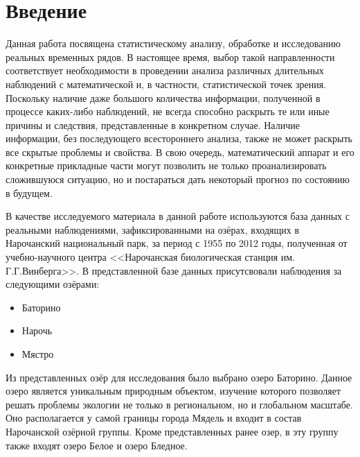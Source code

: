 \newpage

\chapter*{Введение}

Данная работа посвящена статистическому анализу, обработке и исследованию реальных временных рядов. В настоящее время, выбор такой направленности соответствует необходимости в проведении анализа различных длительных наблюдений с математической и, в частности, статистической точек зрения. Поскольку наличие даже большого количества информации, полученной в процессе каких-либо наблюдений, не всегда способно раскрыть те или иные причины и следствия, представленные в конкретном случае. Наличие информации, без последующего всестороннего анализа, также не может раскрыть все скрытые проблемы и свойства. В свою очередь, математический аппарат и его конкретные прикладные части могут позволить не только проанализировать сложившуюся ситуацию, но и постараться дать некоторый прогноз по состоянию в будущем.

В качестве исследуемого материала в данной работе используются база данных с реальными наблюдениями, зафиксированными на озёрах, входящих в Нарочанский национальный парк, за период с 1955 по 2012 годы, полученная от учебно-научного центра <<Нарочанская биологическая станция им. Г.Г.Винберга>>. В представленной базе данных присутсвовали наблюдения за следующими озёрами:
\begin{itemize}
	\item Баторино
	\item Нарочь
	\item Мястро
\end{itemize}
Из представленных озёр для исследования было выбрано озеро Баторино. Данное озеро является уникальным природным объектом, изучение которого позволяет решать проблемы экологии не только в региональном, но и глобальном масштабе. Оно располагается у самой границы города Мядель и входит в состав Нарочанской озёрной группы. Кроме представленных ранее озер, в эту группу также входят озеро Белое и озеро Бледное.

